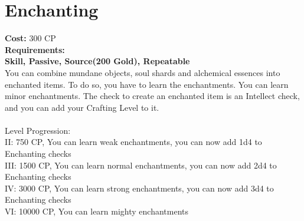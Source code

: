 \section{Enchanting}\label{perk:enchanting}
\textbf{Cost:} 300 CP\\
\textbf{Requirements:} ~\\
\textbf{Skill, Passive, Source(200 Gold), Repeatable}\\
You can combine mundane objects, soul shards and alchemical essences into enchanted items.
To do so, you have to learn the enchantments.
You can learn minor enchantments.
The check to create an enchanted item is an Intellect check, and you can add your Crafting Level to it.\\
\\
Level Progression:\\
II: 750 CP, You can learn weak enchantments, you can now add 1d4 to Enchanting checks\\
III: 1500 CP, You can learn normal enchantments, you can now add 2d4 to Enchanting checks\\
IV: 3000 CP, You can learn strong enchantments, you can now add 3d4 to Enchanting checks\\
VI: 10000 CP, You can learn mighty enchantments\\